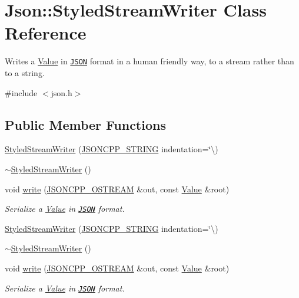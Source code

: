 \hypertarget{class_json_1_1_styled_stream_writer}{}\section{Json\+:\+:Styled\+Stream\+Writer Class Reference}
\label{class_json_1_1_styled_stream_writer}


Writes a \hyperlink{class_json_1_1_value}{Value} in \href{http://www.json.org}{\tt J\+S\+ON} format in a human friendly way, to a stream rather than to a string.  




{\ttfamily \#include $<$json.\+h$>$}

\subsection*{Public Member Functions}
\begin{DoxyCompactItemize}
\item 
\hyperlink{class_json_1_1_styled_stream_writer_a5e41c4e40f11266046bd0ea8f8f5a75e}{Styled\+Stream\+Writer} (\hyperlink{config_8h_a1e723f95759de062585bc4a8fd3fa4be}{J\+S\+O\+N\+C\+P\+P\+\_\+\+S\+T\+R\+I\+NG} indentation=\char`\"{}\textbackslash{})
\item 
\hyperlink{class_json_1_1_styled_stream_writer_a17444a59f617970279714e97b0ddfa46}{$\sim$\+Styled\+Stream\+Writer} ()
\item 
void \hyperlink{class_json_1_1_styled_stream_writer_a5d89d984fe675641e42c4370cd247774}{write} (\hyperlink{config_8h_a37a25be5fca174927780caeb280094ce}{J\+S\+O\+N\+C\+P\+P\+\_\+\+O\+S\+T\+R\+E\+AM} \&out, const \hyperlink{class_json_1_1_value}{Value} \&root)
\begin{DoxyCompactList}\small\item\em Serialize a \hyperlink{class_json_1_1_value}{Value} in \href{http://www.json.org}{\tt J\+S\+ON} format. \end{DoxyCompactList}\item 
\hyperlink{class_json_1_1_styled_stream_writer_a5e41c4e40f11266046bd0ea8f8f5a75e}{Styled\+Stream\+Writer} (\hyperlink{config_8h_a1e723f95759de062585bc4a8fd3fa4be}{J\+S\+O\+N\+C\+P\+P\+\_\+\+S\+T\+R\+I\+NG} indentation=\char`\"{}\textbackslash{})
\item 
\hyperlink{class_json_1_1_styled_stream_writer_a17444a59f617970279714e97b0ddfa46}{$\sim$\+Styled\+Stream\+Writer} ()
\item 
void \hyperlink{class_json_1_1_styled_stream_writer_a5d89d984fe675641e42c4370cd247774}{write} (\hyperlink{config_8h_a37a25be5fca174927780caeb280094ce}{J\+S\+O\+N\+C\+P\+P\+\_\+\+O\+S\+T\+R\+E\+AM} \&out, const \hyperlink{class_json_1_1_value}{Value} \&root)
\begin{DoxyCompactList}\small\item\em Serialize a \hyperlink{class_json_1_1_value}{Value} in \href{http://www.json.org}{\tt J\+S\+ON} format. \end{DoxyCompactList}\end{DoxyCompactItemize}
